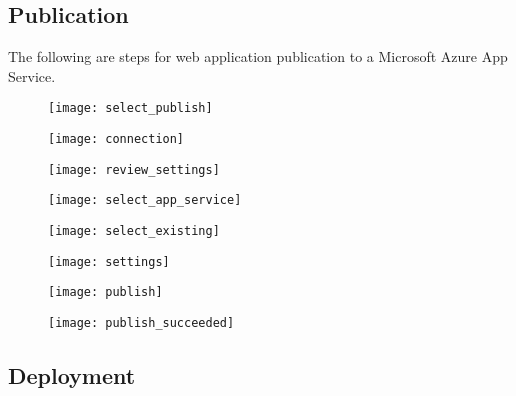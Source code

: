 \subsection{Publication}

\tab The following are steps for web application publication to a Microsoft Azure App Service.

\begin{figure}[H] 
    \centering
    \texttt{[image: select\_publish]}
\end{figure}
    \begin{figure}[H] 
        \centering
        \texttt{[image: connection]}
    \end{figure}

    
    
    \begin{figure}[H] 
        \centering
        \texttt{[image: review\_settings]}
    \end{figure}
    
    \begin{figure}[H] 
        \centering
        \texttt{[image: select\_app\_service]}
    \end{figure}
    
    \begin{figure}[H] 
        \centering
        \texttt{[image: select\_existing]}
    \end{figure}
    
    
    \begin{figure}[H] 
        \centering
        \texttt{[image: settings]}
    \end{figure}
    
    
    
    
    
    
    
    
    \begin{figure}[H] 
        \centering
        \texttt{[image: publish]}
    \end{figure}
    
    \begin{figure}[H] 
        \centering
        \texttt{[image: publish\_succeeded]}
    \end{figure}
    
    
\subsection{Deployment}